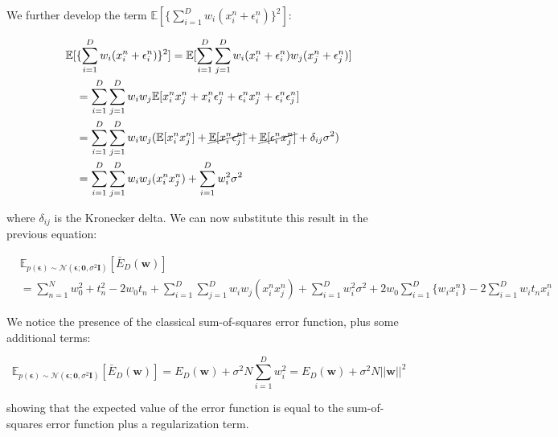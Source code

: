 We further develop the term $\mathbb{E}[\{\sum_{i=1}^{D}w_i(x_i^n+\epsilon_i^n)\}^2]$:

\begin{align*}
    \mathbb{E}[&\{\sum_{i=1}^{D}w_i(x_i^n+\epsilon_i^n)\}^2] = \mathbb{E}[\sum_{i=1}^{D}\sum_{j=1}^{D}w_i(x_i^n + \epsilon_i^n)w_j(x_j^n + \epsilon_j^n)] \\
    &= \sum_{i=1}^D\sum_{j=1}^{D}w_iw_j\mathbb{E}[x_i^nx_j^n + x_i^n\epsilon_j^n + \epsilon_i^nx_j^n + \epsilon_i^n\epsilon_j^n] \\
    &= \sum_{i=1}^D\sum_{j=1}^{D}w_iw_j(\mathbb{E}[x_i^nx_j^n] + \cancel{\mathbb{E}[x_i^n\epsilon_j^n]} + \cancel{\mathbb{E}[\epsilon_i^nx_j^n]} + \delta_{ij}\sigma^2) \\
    &= \sum_{i=1}^D\sum_{j=1}^Dw_iw_j(x_i^nx_j^n) + \sum_{i=1}^Dw_i^2\sigma^2 \\
\end{align*}

where $\delta_{ij}$ is the Kronecker delta. We can now substitute this result in the previous equation:

\begin{align*}
    &\mathbb{E}_{p(\pmb{\epsilon}) \sim \mathcal{N}(\pmb{\epsilon} ; \mathbf{0}, \sigma^{2} \mathbf{I})} [\bar{E}_D(\mathbf{w})] \\ &= \sum_{n=1}^{N} w_0^2 + t_n^2 - 2w_0t_n + \sum_{i=1}^D\sum_{j=1}^Dw_iw_j(x_i^nx_j^n) + \sum_{i=1}^Dw_i^2\sigma^2 + 2w_0\sum_{i=1}^{D}\{w_ix_i^n\} - 2\sum_{i=1}^{D}w_it_nx_i^n
\end{align*}

We notice the presence of the classical sum-of-squares error function, plus some additional terms:

\begin{equation*}
    \mathbb{E}_{p(\pmb{\epsilon}) \sim \mathcal{N}(\pmb{\epsilon} ; \mathbf{0}, \sigma^{2} \mathbf{I})} [\bar{E}_D(\mathbf{w})] = E_D(\mathbf{w}) + \sigma^2N\sum_{i=1}^Dw_i^2 = E_D(\mathbf{w}) + \sigma^2N ||\mathbf{w}||^2
\end{equation*}

showing that the expected value of the error function is equal to the sum-of-squares error function plus a regularization term.  